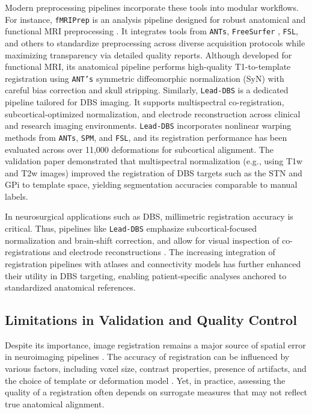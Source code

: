 Modern preprocessing pipelines incorporate these tools into modular workflows. For instance, \texttt{fMRIPrep} is an analysis pipeline designed for robust anatomical and functional MRI preprocessing \cite{Esteban2019-oz}. It integrates tools from \texttt{ANTs}, \texttt{FreeSurfer} \cite{Fischl2012-dp}, \texttt{FSL}, and others to standardize preprocessing across diverse acquisition protocols while maximizing transparency via detailed quality reports. Although developed for functional MRI, its anatomical pipeline performs high-quality T1-to-template registration using \texttt{ANT's} symmetric diffeomorphic normalization (SyN) with careful bias correction and skull stripping. Similarly, \texttt{Lead-DBS} is a dedicated pipeline tailored for DBS imaging. It supports multispectral co-registration, subcortical-optimized normalization, and electrode reconstruction across clinical and research imaging environments. \texttt{Lead-DBS} incorporates nonlinear warping methods from \texttt{ANTs}, \texttt{SPM}, and \texttt{FSL}, and its registration performance has been evaluated across over 11,000 deformations for subcortical alignment. The validation paper \cite{Ewert2019-cc} demonstrated that multispectral normalization (e.g., using T1w and T2w images) improved the registration of DBS targets such as the STN and GPi to template space, yielding segmentation accuracies comparable to manual labels. 

In neurosurgical applications such as DBS, millimetric registration accuracy is critical. Thus, pipelines like \texttt{Lead-DBS} emphasize subcortical-focused normalization and brain-shift correction, and allow for visual inspection of co-registrations and electrode reconstructions \cite{Neudorfer2023-wd}. The increasing integration of registration pipelines with atlases and connectivity models has further enhanced their utility in DBS targeting, enabling patient-specific analyses anchored to standardized anatomical references.

\subsection{Limitations in Validation and Quality Control}
Despite its importance, image registration remains a major source of spatial error in neuroimaging pipelines \cite{Lau2019-eh, Abbass2022-lf}. The accuracy of registration can be influenced by various factors, including voxel size, contrast properties, presence of artifacts, and the choice of template or deformation model \cite{Klein2009-lv, Ewert2019-cc}. Yet, in practice, assessing the quality of a registration often depends on surrogate measures that may not reflect true anatomical alignment.

